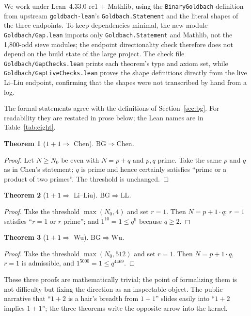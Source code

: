\documentclass[11pt,a4paper]{article}
\theoremstyle{plain}
\newtheorem{theorem}{Theorem}[section]
\theoremstyle{definition}
\newcommand{\BG}{\mathrm{BG}}
\newcommand{\Chen}{\mathrm{Chen}}
\newcommand{\LL}{\mathrm{LL}}
\newcommand{\WU}{\mathrm{Wu}}
\begin{document}
We work under Lean~4.33.0-rc1 + Mathlib, using the \texttt{BinaryGoldbach} definition from upstream \texttt{goldbach-lean}'s \texttt{Goldbach.Statement} and the literal shapes of the three endpoints. To keep dependencies minimal, the new module \texttt{Goldbach/Gap.lean} imports only \texttt{Goldbach.Statement} and Mathlib, not the 1,800-odd sieve modules; the endpoint directionality check therefore does not depend on the build state of the large project. The check file \texttt{Goldbach/GapChecks.lean} prints each theorem's type and axiom set, while \texttt{Goldbach/GapLiveChecks.lean} proves the shape definitions directly from the live Li--Liu endpoint, confirming that the shapes were not transcribed by hand from a log.

The formal statements agree with the definitions of Section~\ref{sec:bg}. For readability they are restated in prose below; the Lean names are in Table~\ref{tab:eight}.

\begin{theorem}[$1+1\Rightarrow$ Chen]
\label{thm:bg-chen}
$\BG\Longrightarrow\Chen$.
\end{theorem}
\begin{proof}
Let $N\ge N_0$ be even with $N=p+q$ and $p,q$ prime. Take the same $p$ and $q$ as in Chen's statement; $q$ is prime and hence certainly satisfies ``prime or a product of two primes''. The threshold is unchanged.
\end{proof}

\begin{theorem}[$1+1\Rightarrow$ Li--Liu]
\label{thm:bg-ll}
$\BG\Longrightarrow\LL$.
\end{theorem}
\begin{proof}
Take the threshold $\max(N_0,4)$ and set $r=1$. Then $N=p+1\cdot q$; $r=1$ satisfies ``$r=1$ or $r$ prime''; and $1^{10}=1\le q^9$ because $q\ge2$.
\end{proof}

\begin{theorem}[$1+1\Rightarrow$ Wu]
\label{thm:bg-wu}
$\BG\Longrightarrow\WU$.
\end{theorem}
\begin{proof}
Take the threshold $\max(N_0,512)$ and set $r=1$. Then $N=p+1\cdot q$, $r=1$ is admissible, and $1^{5000}=1\le q^{4469}$.
\end{proof}

These three proofs are mathematically trivial; the point of formalizing them is not difficulty but fixing the direction as an inspectable object. The public narrative that ``$1+2$ is a hair's breadth from $1+1$'' slides easily into ``$1+2$ implies $1+1$''; the three theorems write the opposite arrow into the kernel.
\end{document}
